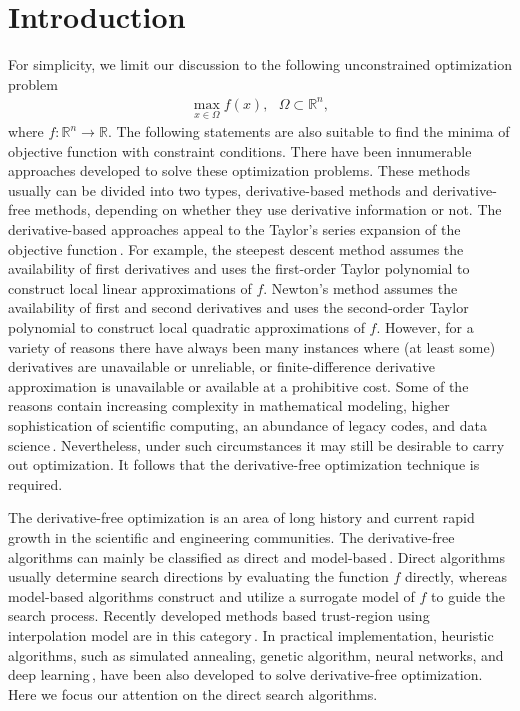 \documentclass[mathpazo]{aamm}
\newcommand{\bmx}{x}
\newcommand{\Real}{\mathbb{R}}
\begin{document}
\maketitle

\section{Introduction}
\label{sec:intro}

For simplicity, we limit our discussion to the following
unconstrained optimization problem
\begin{align*}
	\max_{\bmx\in\Omega}f(\bmx),~~~ \Omega\subset\Real^n,
\end{align*}
where $f:\Real^n\to\Real$.
The following statements are also suitable to find the minima of
objective function with constraint conditions.
There have been innumerable approaches developed to solve these
optimization problems. These methods usually can be divided into
two types, derivative-based methods and derivative-free methods,
depending on whether they use derivative information or not. 
The derivative-based approaches appeal to the Taylor's series
expansion of the objective function\,\cite{sun2006optimization,
conn2000trust,nocedal2006numerical}. For example, the
steepest descent method assumes the availability of first
derivatives and uses the first-order Taylor polynomial to
construct local linear approximations of $f$. 
Newton's method assumes the availability of first
and second derivatives and uses the second-order Taylor
polynomial to construct local quadratic approximations of $f$.
However, for a variety of reasons there have always been many
instances where (at least some) derivatives are unavailable or
unreliable, or finite-difference derivative approximation is
unavailable or available at a prohibitive cost. 
Some of the reasons contain increasing complexity in
mathematical modeling, higher sophistication of scientific
computing, an abundance of legacy codes, and data
science\,\cite{conn2009introduction}. Nevertheless, under such
circumstances it may still be desirable to carry out
optimization. It follows that the derivative-free optimization
technique is required. 

The derivative-free optimization is an area of long history and
current rapid growth in the scientific and engineering communities. 
The derivative-free algorithms can mainly be classified as direct and
model-based\,\cite{rios2013derivative}.
Direct algorithms usually determine search directions by evaluating the
function $f$ directly, whereas model-based algorithms construct
and utilize a surrogate model of $f$ to guide the search process.
Recently developed methods based trust-region using
interpolation model are in this category\,\cite{powell2000uobyqa,
powell2002trust, wu2009heuristic, zhang2014sobolev}. 
In practical implementation, heuristic algorithms, such as
simulated annealing, genetic algorithm, neural networks, and deep
learning\,\cite{michalewicz2004how, lecun2015deep}, have been also
developed to solve derivative-free optimization.
Here we focus our attention on the direct search algorithms.
\end{document}
